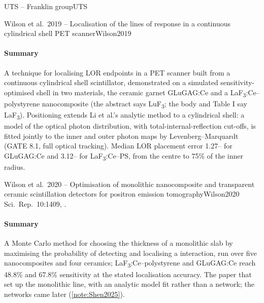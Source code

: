 \begin{programnote}{UTS -- Franklin group}{UTS}
\begin{papernote}{Wilson et al.\ 2019 -- Localisation of the lines of response in a continuous cylindrical shell PET scanner}{Wilson2019}
\paragraph{Summary}
A technique for localising LOR endpoints in a PET scanner built from a
continuous cylindrical shell scintillator, demonstrated on a simulated
sensitivity-optimised shell in two materials, the ceramic garnet GLuGAG:Ce and
a LaF\textsubscript{3}:Ce--polystyrene nanocomposite (the abstract says
LuF\textsubscript{3}; the body and Table I say LaF\textsubscript{3}).
Positioning extends Li et al.'s analytic method to a cylindrical shell: a model
of the optical photon distribution, with total-internal-reflection cut-offs, is
fitted jointly to the inner and outer photon maps by Levenberg--Marquardt (GATE
8.1, full optical tracking). Median LOR placement error 1.27-- for
GLuGAG:Ce and 3.12-- for LaF\textsubscript{3}:Ce--PS, from the centre
to 75\% of the inner radius.

\end{papernote}

\begin{papernote}{Wilson et al.\ 2020 -- Optimisation of monolithic nanocomposite and transparent ceramic scintillation detectors for positron emission tomography}{Wilson2020}
Sci.\ Rep.\ 10:1409, .

\paragraph{Summary}
A Monte Carlo method for choosing the thickness of a monolithic slab by
maximising the probability of detecting and localising a 
interaction, run over five nanocomposites and four ceramics; LaF\textsubscript{3}:Ce--polystyrene
and GLuGAG:Ce reach 48.8\% and 67.8\% sensitivity at the stated localisation
accuracy. The paper that set up the monolithic line, with an analytic
model fit rather than a network; the networks came later (\ref{note:Shen2025}).

\end{papernote}


\end{programnote}
